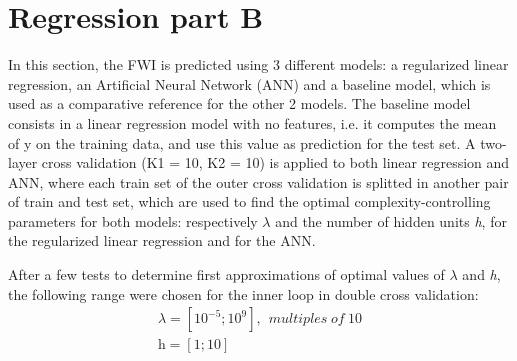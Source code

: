 \documentclass[10pt]{article}
\numberwithin{equation}{section}
\numberwithin{figure}{section}
\numberwithin{table}{section}
\begin{document}

\section{Regression part B}

In this section, the FWI is predicted using 3 different models: a regularized linear regression, an Artificial Neural Network (ANN) and a baseline model, which is used as a comparative reference for the other 2 models.
The baseline model consists in a linear regression model with no
features, i.e. it computes the mean of y on the training data, and use this value as prediction for the test set.
A two-layer cross validation (K1 = 10, K2 = 10) is applied to both linear regression and ANN, where each train set of the outer cross validation is splitted in another pair of train and test set, which are used to find the optimal complexity-controlling parameters for both models: respectively $\lambda$ and the number of hidden units \textit{h}, for the regularized linear regression and for the ANN.

After a few tests to determine first approximations of optimal values of $\lambda$ and \textit{h}, the following range were chosen for the inner loop in double cross validation:
\begin{equation*}
\begin{multlined*}

    

    \lambda = [10^{-5}; 10^{9}], \hspace{5pt} multiples \hspace{3pt} of \hspace{3pt} 10 \\
   
    \textit{h} = [1; 10]

\end{multlined*}
\end{equation*}
\end{document}
